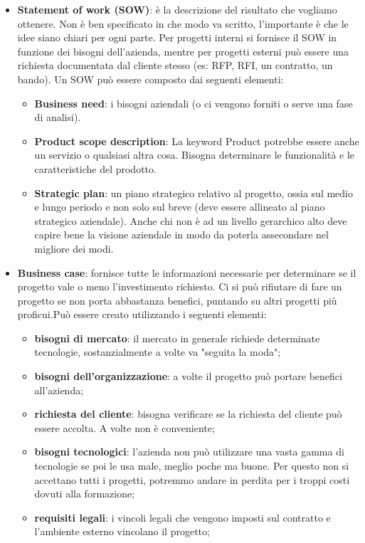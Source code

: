 \begin{itemize}
	\item \textbf{Statement of work (SOW)}: è la descrizione del risultato che vogliamo ottenere. Non è ben specificato in che modo va scritto, l'importante è che le idee siano chiari per ogni parte.
	Per progetti interni si fornisce il SOW in funzione dei bisogni dell'azienda, mentre per progetti esterni può essere una richiesta documentata dal cliente stesso (es: RFP, RFI, un contratto, un bando). Un SOW può essere composto dai seguenti elementi:
	\begin{itemize}
		\item \textbf{Business need}: i bisogni aziendali (o ci vengono forniti o serve una fase di analisi).
		\item \textbf{Product scope description}: La keyword Product potrebbe essere anche un servizio o qualsiasi altra cosa. Bisogna determinare le funzionalità e le caratteristiche del prodotto.
		\item \textbf{Strategic plan}: un piano strategico relativo al progetto, ossia sul medio e lungo periodo e non solo sul breve (deve essere allineato al piano strategico aziendale). Anche chi non è ad un livello gerarchico alto deve capire bene la visione  aziendale in modo da poterla assecondare nel migliore dei modi.
	\end{itemize}
	\item \textbf{Business case}: fornisce tutte le informazioni necessarie per determinare se il progetto vale o meno l'investimento richiesto. Ci si può rifiutare di fare un progetto se non porta abbastanza benefici, puntando su altri progetti più proficui.Può essere creato utilizzando i seguenti elementi:
	\begin{itemize}
		\item \textbf{bisogni di mercato}: il mercato in generale richiede determinate tecnologie, sostanzialmente a volte va "seguita la moda";
		\item \textbf{bisogni dell'organizzazione}: a volte il progetto può portare benefici all'azienda;
		\item \textbf{richiesta del cliente}:  bisogna verificare se la richiesta del cliente può essere accolta. A volte non è conveniente;
		\item \textbf{bisogni tecnologici}: l'azienda non può utilizzare una vasta gamma di tecnologie se poi le usa male, meglio poche ma buone. Per questo non si accettano tutti i progetti, potremmo andare in perdita per i troppi costi dovuti alla formazione;
		\item \textbf{requisiti legali}: i vincoli legali che vengono imposti sul contratto e l'ambiente esterno vincolano il progetto;

\end{itemize}
\end{itemize}
